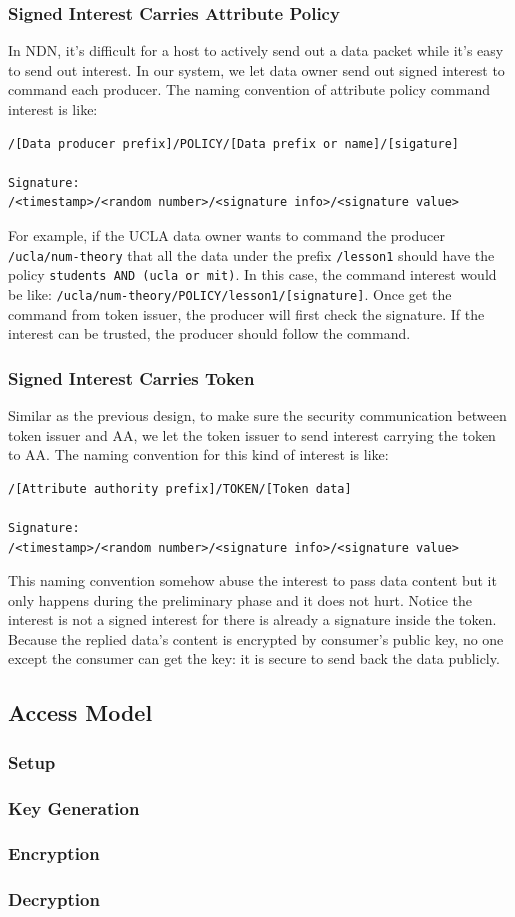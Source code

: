 \subsubsection{Signed Interest Carries Attribute Policy}

In NDN, it's difficult for a host to actively send out a data packet while it's easy to send out interest.
In our system, we let data owner send out signed interest to command each producer.
The naming convention of attribute policy command interest is like:
\begin{verbatim}
/[Data producer prefix]/POLICY/[Data prefix or name]/[sigature]

Signature:
/<timestamp>/<random number>/<signature info>/<signature value>
\end{verbatim}
For example, if the UCLA data owner wants to command the producer \texttt{/ucla/num-theory} that all the data under the prefix \texttt{/lesson1} should have the policy \texttt{students AND (ucla or mit)}.
In this case, the command interest would be like: \texttt{/ucla/num-theory/POLICY/lesson1/[signature]}.
Once get the command from token issuer, the producer will first check the signature.
If the interest can be trusted, the producer should follow the command.

\subsubsection{Signed Interest Carries Token}

Similar as the previous design, to make sure the security communication between token issuer and AA, we let the token issuer to send interest carrying the token to AA.
The naming convention for this kind of  interest is like:
\begin{verbatim}
/[Attribute authority prefix]/TOKEN/[Token data]

Signature:
/<timestamp>/<random number>/<signature info>/<signature value>
\end{verbatim}
This naming convention somehow abuse the interest to pass data content but it only happens during the preliminary phase and it does not hurt.
Notice the interest is not a signed interest for there is already a signature inside the token.
Because the replied data's content is encrypted by consumer's public key, no one except the consumer can get the key: it is secure to send back the data publicly.

\subsection{Access Model}


\subsubsection{Setup}


\subsubsection{Key Generation}
\subsubsection{Encryption}
\subsubsection{Decryption}
